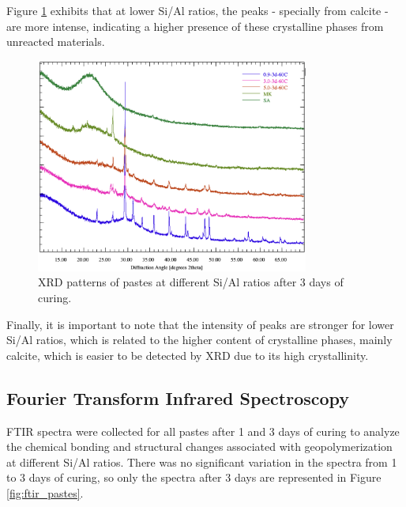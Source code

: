 Figure \ref{fig:xrd_pastes} exhibits that at lower Si/Al ratios, the peaks - specially from calcite - are more intense, indicating a higher presence of these crystalline phases from unreacted materials.


\begin{figure}[H]
    \centering
    \includegraphics[width=0.8\textwidth]{Cap4/images/xrd_pastes_shifted.png}
    \caption{XRD patterns of pastes at different Si/Al ratios after 3 days of curing.}
    \label{fig:xrd_pastes}
\end{figure}

Finally, it is important to note that the intensity of peaks are stronger for lower Si/Al ratios, which is related to the higher content of crystalline phases, mainly calcite, which is easier to be detected by XRD due to its high crystallinity.

\subsection{Fourier Transform Infrared Spectroscopy}

FTIR spectra were collected for all pastes after 1 and 3 days of curing to analyze the chemical bonding and structural changes associated with geopolymerization at different Si/Al ratios.
There was no significant variation in the spectra from 1 to 3 days of curing, so only the spectra after 3 days are represented in Figure \ref{fig:ftir_pastes}.

